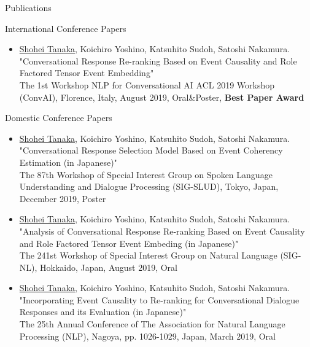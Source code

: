 \documentclass{resume} %
\begin{document}

\begin{rSection}{Publications}

\begin{rSubsection}{International Conference Papers}{}{}{}
\begin{itemize}
\item \underline{Shohei Tanaka}, Koichiro Yoshino, Katsuhito Sudoh, Satoshi Nakamura.
\\"Conversational Response Re-ranking Based on Event Causality and Role Factored Tensor Event Embedding"
\\The 1st Workshop NLP for Conversational AI ACL 2019 Workshop (ConvAI), Florence, Italy, August 2019, Oral\&Poster, {\bf Best Paper Award}
\end{itemize}
\end{rSubsection}

\begin{rSubsection}{Domestic Conference Papers}{}{}{}
\begin{itemize}
\item \underline{Shohei Tanaka}, Koichiro Yoshino, Katsuhito Sudoh, Satoshi Nakamura.
\\"Conversational Response Selection Model Based on Event Coherency Estimation (in Japanese)"
\\The 87th Workshop of Special Interest Group on Spoken Language Understanding and Dialogue Processing (SIG-SLUD), Tokyo, Japan, December 2019, Poster

\item \underline{Shohei Tanaka}, Koichiro Yoshino, Katsuhito Sudoh, Satoshi Nakamura.
\\"Analysis of Conversational Response Re-ranking Based on Event Causality and Role Factored Tensor Event Embeding (in Japanese)"
\\The 241st Workshop of Special Interest Group on Natural Language (SIG-NL), Hokkaido, Japan, August 2019, Oral

\item \underline{Shohei Tanaka}, Koichiro Yoshino, Katsuhito Sudoh, Satoshi Nakamura.
\\"Incorporating Event Causality to Re-ranking for Conversational Dialogue Responses and its Evaluation (in Japanese)"
\\The 25th Annual Conference of The Association for Natural Language Processing (NLP), Nagoya, pp. 1026-1029, Japan, March 2019, Oral


\end{itemize}
\end{rSubsection}
\end{rSection}
\end{document}
